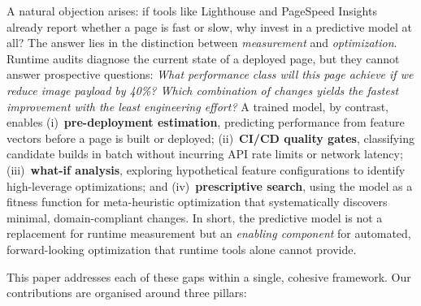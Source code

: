 \documentclass[sn-nature]{sn-jnl}
\begin{document}
A natural objection arises: if tools like Lighthouse and PageSpeed Insights already report whether a page is fast or slow, why invest in a predictive model at all? The answer lies in the distinction between \textit{measurement} and \textit{optimization}. Runtime audits diagnose the current state of a deployed page, but they cannot answer prospective questions: \textit{What performance class will this page achieve if we reduce image payload by 40\%? Which combination of changes yields the fastest improvement with the least engineering effort?} A trained model, by contrast, enables (i)~\textbf{pre-deployment estimation}, predicting performance from feature vectors before a page is built or deployed; (ii)~\textbf{CI/CD quality gates}, classifying candidate builds in batch without incurring API rate limits or network latency; (iii)~\textbf{what-if analysis}, exploring hypothetical feature configurations to identify high-leverage optimizations; and (iv)~\textbf{prescriptive search}, using the model as a fitness function for meta-heuristic optimization that systematically discovers minimal, domain-compliant changes. In short, the predictive model is not a replacement for runtime measurement but an \textit{enabling component} for automated, forward-looking optimization that runtime tools alone cannot provide.

This paper addresses each of these gaps within a single, cohesive framework. Our contributions are organised around three pillars:
\end{document}
